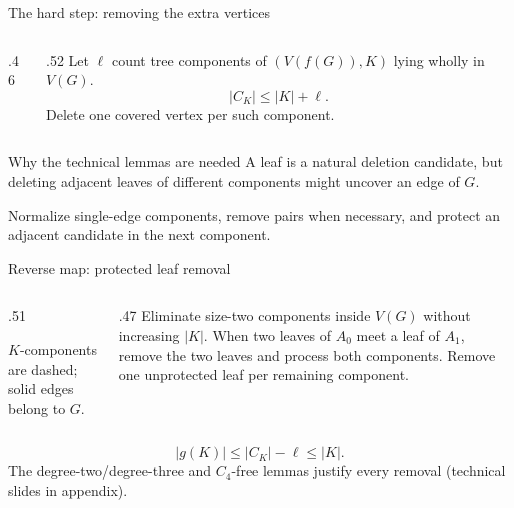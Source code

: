 \begin{frame}{The hard step: removing the extra vertices}
 \begin{columns}[c,onlytextwidth]
  \begin{column}{.46\textwidth}
   \centering\resizebox{.95\linewidth}{!}{\ExcessTreeFig}
  \end{column}
  \begin{column}{.52\textwidth}
   Let $\ell$ count tree components of $(V(f(G)),K)$ lying wholly in $V(G)$.
   \[|C_K|\le|K|+\ell.\]
    Delete one covered vertex per such component.
  \end{column}
 \end{columns}
 \vspace{.15cm}
 \begin{block}{Why the technical lemmas are needed}
 A leaf is a natural deletion candidate, but deleting adjacent leaves of different components might uncover an edge of $G$.
 \end{block}
 \small Normalize single-edge components, remove pairs when necessary, and protect an adjacent candidate in the next component.
\end{frame}


\begin{frame}{Reverse map: protected leaf removal}
 \begin{columns}[c,onlytextwidth]
  \begin{column}{.51\textwidth}
   \centering\resizebox{.98\linewidth}{!}{\PairedRemovalFig}
   \par\small $K$-components are dashed; solid edges belong to $G$.
  \end{column}
  \begin{column}{.47\textwidth}
    Eliminate size-two components inside $V(G)$ without increasing $|K|$.
   \vspace{.08cm}
    When two leaves of $A_0$ meet a leaf of $A_1$, remove the two leaves and process both components.
   \vspace{.08cm}
    Remove one unprotected leaf per remaining component.
  \end{column}
 \end{columns}
 \vspace{.22cm}
 \[\boxed{|g(K)|\le |C_K|-\ell\le |K|}.\]
 \small The degree-two/degree-three and $C_4$-free lemmas justify every removal (technical slides in appendix).
\end{frame}


